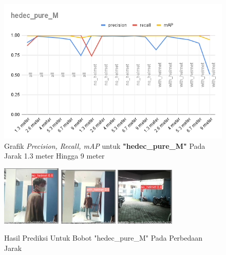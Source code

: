 \begin{enumerate}
  \begin{figure} [h!]
    \centering
    \includegraphics[width=1\textwidth]{gambar/BerdasarkanJarak/hedec_pure_M.png}
    \caption{Grafik \emph{Precision, Recall, mAP} untuk \textbf{"hedec\_pure\_M"} Pada Jarak 1.3 meter Hingga 9 meter}
    \label{fig:grafvaljarak_hedec_pure_M}  
  \end{figure}

  \begin{figure} [h!]
    \centering
    \includegraphics[width=0.25\textwidth]{gambar/BerdasarkanJarak_v2/val_hedec_pure_M/Jarak1_3/val_batch0_pred.jpg}
    \includegraphics[width=0.25\textwidth]{gambar/BerdasarkanJarak_v2/val_hedec_pure_M/Jarak5_3/val_batch0_pred.jpg}
    \includegraphics[width=0.25\textwidth]{gambar/BerdasarkanJarak_v2/val_hedec_pure_M/Jarak9/val_batch0_pred.jpg}
    \caption{Hasil Prediksi Untuk Bobot "hedec\_pure\_M" Pada Perbedaan Jarak}
    \label{fig:valjarak_sample_hedec_pure_M}  
  \end{figure}


\end{enumerate}
